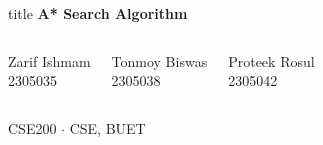 \begin{frame}[plain]
  \begin{beamercolorbox}[wd=\textwidth,sep=13pt,rounded=true,shadow=true]{title}
    \centering
    {\LARGE\bfseries A* Search Algorithm}\\[7pt]
  \end{beamercolorbox}

  \vspace{2.2em}
  \begin{center}
    \begin{columns}[c]
      \begin{center}
        {\large Zarif Ishmam }\\[7pt]
        {\large 2305035}\\[7pt]
      \end{center}
      \vspace{-0.5em}
      \begin{center}
        {\large Tonmoy Biswas}\\[7pt]
        {\large 2305038}\\[7pt]
      \end{center}
      \begin{center}
        {\large Proteek Rosul}\\[7pt]
        {\large 2305042}
      \end{center}
    \end{columns}
  \end{center}

  \vspace{1.8em}
  \begin{center}
    {\footnotesize\scshape CSE200 $\cdot$ CSE, BUET}
  \end{center}
\end{frame}
